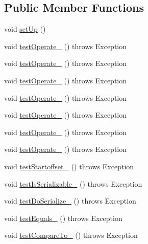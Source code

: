 \subsection*{Public Member Functions}
\begin{DoxyCompactItemize}
\item 
void \hyperlink{classorg_1_1jgap_1_1impl_1_1_greedy_crossover_test_aa77338afdba0ad79030637334731c920}{set\-Up} ()
\item 
void \hyperlink{classorg_1_1jgap_1_1impl_1_1_greedy_crossover_test_a9e73e322e121cad936d1da75de70f124}{test\-Operate\-\_} ()  throws Exception 
\item 
void \hyperlink{classorg_1_1jgap_1_1impl_1_1_greedy_crossover_test_ac18a00b11197c8693e0afa979b5c4825}{test\-Operate\-\_} ()  throws Exception 
\item 
void \hyperlink{classorg_1_1jgap_1_1impl_1_1_greedy_crossover_test_a0b08976c5eea0c285060b7bee9032a61}{test\-Operate\-\_} ()  throws Exception 
\item 
void \hyperlink{classorg_1_1jgap_1_1impl_1_1_greedy_crossover_test_ae4eea9f850cb93ec5502808e9bf629b7}{test\-Operate\-\_} ()  throws Exception 
\item 
void \hyperlink{classorg_1_1jgap_1_1impl_1_1_greedy_crossover_test_aa9d516cc8f30ae04f055a06297e55ec6}{test\-Operate\-\_} ()  throws Exception 
\item 
void \hyperlink{classorg_1_1jgap_1_1impl_1_1_greedy_crossover_test_a78165e06fe8f0d2cfa279ba960414af0}{test\-Operate\-\_} ()  throws Exception 
\item 
void \hyperlink{classorg_1_1jgap_1_1impl_1_1_greedy_crossover_test_aca09e913ce69f792bcfab397cccfa41f}{test\-Operate\-\_} ()  throws Exception 
\item 
void \hyperlink{classorg_1_1jgap_1_1impl_1_1_greedy_crossover_test_a6221dc391054efad6fbf07f1902b7210}{test\-Startoffset\-\_} ()  throws Exception 
\item 
void \hyperlink{classorg_1_1jgap_1_1impl_1_1_greedy_crossover_test_a68ff43a170479677f7346f7a1990a8e6}{test\-Is\-Serializable\-\_} ()  throws Exception 
\item 
void \hyperlink{classorg_1_1jgap_1_1impl_1_1_greedy_crossover_test_a28a4ea305502d83d6ecd570beefa1332}{test\-Do\-Serialize\-\_} ()  throws Exception 
\item 
void \hyperlink{classorg_1_1jgap_1_1impl_1_1_greedy_crossover_test_ad43863ad57b028b6707b27dd17624b9e}{test\-Equals\-\_} ()  throws Exception 
\item 
void \hyperlink{classorg_1_1jgap_1_1impl_1_1_greedy_crossover_test_af655a0f213bf8e758b44c1b76ddbb741}{test\-Compare\-To\-\_} ()  throws Exception 
\end{DoxyCompactItemize}
